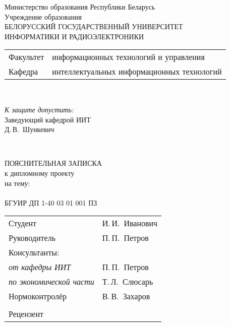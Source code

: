 \begin{titlepage}
  \begin{center}
    Министерство образования Республики Беларусь\\[1em]
    Учреждение образования\\
    БЕЛОРУССКИЙ ГОСУДАРСТВЕННЫЙ УНИВЕРСИТЕТ \\
    ИНФОРМАТИКИ И РАДИОЭЛЕКТРОНИКИ\\[1em]

    \begin{minipage}{\textwidth}
      \begin{flushleft}
        \begin{tabular}{ l l }
          Факультет & информационных технологий и управления\\
          Кафедра   & интеллектуальных информационных технологий
        \end{tabular}
      \end{flushleft}
    \end{minipage}\\[1em]

    \begin{flushright}
      \begin{minipage}{0.4\textwidth}
        \textit{К защите допустить:}\\[0.8em]
        Заведующий кафедрой ИИТ\\[0.45em]
        \underline{\hspace*{2.8cm}} Д.\,В.~Шункевич
      \end{minipage}\\[2.2em]
    \end{flushright}

    {ПОЯСНИТЕЛЬНАЯ ЗАПИСКА}\\
    {к дипломному проекту}\\
    {на тему:}\\[1em]
    \textbf{\large \MakeUppercase{\topicName}}\\[1em]


    {БГУИР ДП 1-40 03 01 001 ПЗ}\\[2em]
    
    \begin{tabular}{ p{}p{} }
      Студент & И.\,И.~Иванович \\
      Руководитель & П.\,П.~Петров \\
      Консультанты: &\\
      \hspace*{3ex}\emph{от кафедры ИИТ} & П.\,П.~Петров \\
      \hspace*{3ex}\emph{по экономической части} & Т.\,Л.~Слюсарь \\
      Нормоконтролёр & В.\,В.~Захаров\\
      & \\
      Рецензент &
    \end{tabular}
    

\end{center}
\end{titlepage}
